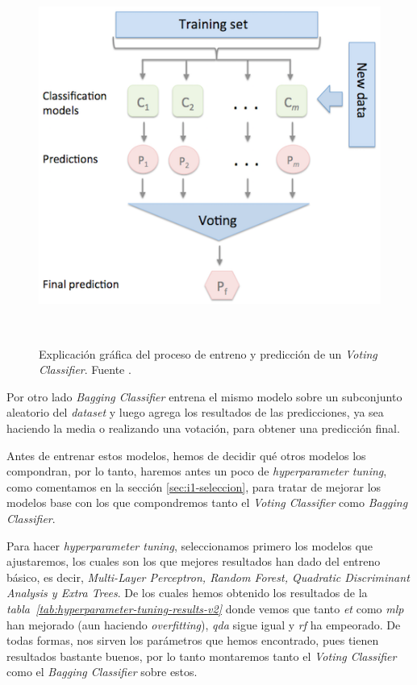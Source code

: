 \begin{figure}[!h]
    \centering
    \includegraphics[width=0.7\linewidth]{media/images/majority_voting.png}
    \caption{Explicación gráfica del proceso de entreno y predicción de un \textit{Voting Classifier}. Fuente \cite{Ensemble96:online}.}\ \label{fig:voting-classifiers}
\end{figure}

Por otro lado \textit{Bagging Classifier} entrena el mismo modelo sobre un subconjunto aleatorio del \textit{dataset} y luego agrega los resultados de las predicciones, ya sea haciendo la media o realizando una votación, para obtener una predicción final.\ \cite{sklearne53:online}


Antes de entrenar estos modelos, hemos de decidir qué otros modelos los compondran, por lo tanto, haremos antes un poco de \textit{hyperparameter tuning}, como comentamos en la sección \ref{sec:i1-seleccion}, para tratar de mejorar los modelos base con los que compondremos tanto el \textit{Voting Classifier} como \textit{Bagging Classifier}.

Para hacer \textit{hyperparameter tuning}, seleccionamos primero los modelos que ajustaremos, los cuales son los que mejores resultados han dado del entreno básico, es decir, \textit{Multi-Layer Perceptron, Random Forest, Quadratic Discriminant Analysis y Extra Trees}. De los cuales hemos obtenido los resultados de la \textit{tabla\ \ref{tab:hyperparameter-tuning-results-v2}} donde vemos que tanto \textit{et} como \textit{mlp} han mejorado (aun haciendo \textit{overfitting}), \textit{qda} sigue igual y \textit{rf} ha empeorado. De todas formas, nos sirven los parámetros que hemos encontrado, pues tienen resultados bastante buenos, por lo tanto montaremos tanto el \textit{Voting Classifier} como el \textit{Bagging Classifier} sobre estos.



